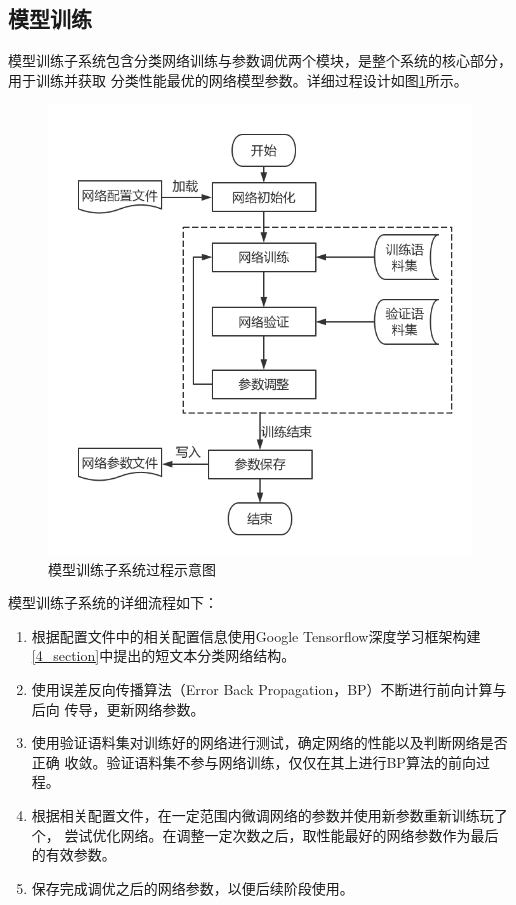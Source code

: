 \subsection{模型训练}
模型训练子系统包含分类网络训练与参数调优两个模块，是整个系统的核心部分，用于训练并获取
分类性能最优的网络模型参数。详细过程设计如图\ref{train}所示。
\begin{figure}[!hbp]
    \includegraphics[scale=0.6]{picture/train.png}
    \caption{模型训练子系统过程示意图}
    \label{train}
\end{figure}

模型训练子系统的详细流程如下：
\begin{enumerate}
    \item 根据配置文件中的相关配置信息使用Google Tensorflow深度学习框架构建
    \ref{4_section}中提出的短文本分类网络结构。
    \item 使用误差反向传播算法（Error Back Propagation，BP）不断进行前向计算与后向
    传导，更新网络参数。
    \item 使用验证语料集对训练好的网络进行测试，确定网络的性能以及判断网络是否正确
    收敛。验证语料集不参与网络训练，仅仅在其上进行BP算法的前向过程。
    \item 根据相关配置文件，在一定范围内微调网络的参数并使用新参数重新训练玩了个，
    尝试优化网络。在调整一定次数之后，取性能最好的网络参数作为最后的有效参数。
    \item 保存完成调优之后的网络参数，以便后续阶段使用。
\end{enumerate}

